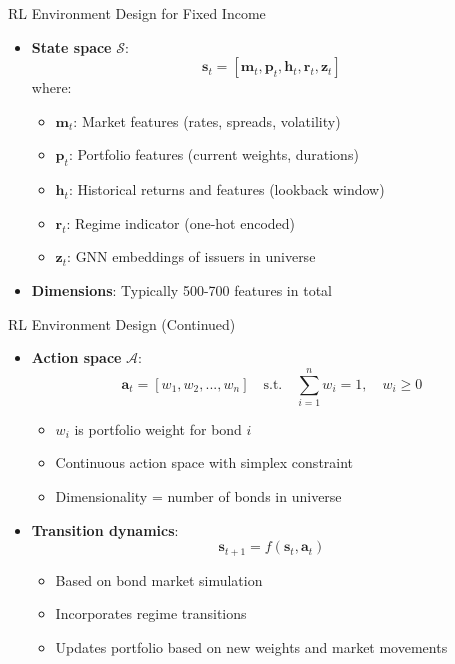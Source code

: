 \documentclass{beamer}
\begin{document}
\begin{frame}{RL Environment Design for Fixed Income}
\begin{itemize}
    \item \textbf{State space} $\mathcal{S}$:
    \begin{equation}
    \mathbf{s}_t = [\mathbf{m}_t, \mathbf{p}_t, \mathbf{h}_t, \mathbf{r}_t, \mathbf{z}_t]
    \end{equation}
    where:
    \begin{itemize}
        \item $\mathbf{m}_t$: Market features (rates, spreads, volatility)
        \item $\mathbf{p}_t$: Portfolio features (current weights, durations)
        \item $\mathbf{h}_t$: Historical returns and features (lookback window)
        \item $\mathbf{r}_t$: Regime indicator (one-hot encoded)
        \item $\mathbf{z}_t$: GNN embeddings of issuers in universe
    \end{itemize}
    \item \textbf{Dimensions}: Typically 500-700 features in total
\end{itemize}
\end{frame}



\begin{frame}{RL Environment Design (Continued)}
\begin{itemize}
    \item \textbf{Action space} $\mathcal{A}$:
    \begin{equation}
    \mathbf{a}_t = [w_1, w_2, ..., w_n] \quad \text{s.t.} \quad \sum_{i=1}^n w_i = 1, \quad w_i \geq 0
    \end{equation}
    \begin{itemize}
        \item $w_i$ is portfolio weight for bond $i$
        \item Continuous action space with simplex constraint
        \item Dimensionality = number of bonds in universe
    \end{itemize}
    
    \item \textbf{Transition dynamics}:
    \begin{equation}
    \mathbf{s}_{t+1} = f(\mathbf{s}_t, \mathbf{a}_t)
    \end{equation}
    \begin{itemize}
        \item Based on bond market simulation
        \item Incorporates regime transitions
        \item Updates portfolio based on new weights and market movements
    \end{itemize}
\end{itemize}
\end{frame}
\end{document}
